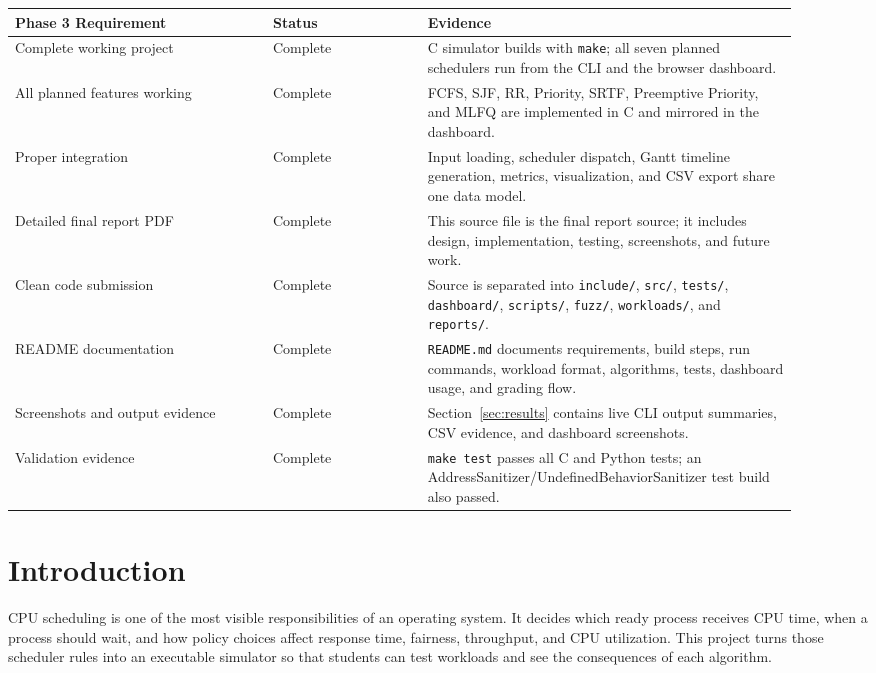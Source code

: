 \documentclass[11pt]{article}
\newcommand{\statusdone}{\textcolor{success}{Complete}}
\begin{document}
\begin{longtable}{p{0.30\linewidth}p{0.18\linewidth}p{0.43\linewidth}}
\toprule
\textbf{Phase 3 Requirement} & \textbf{Status} & \textbf{Evidence} \\
\midrule
Complete working project & \statusdone & C simulator builds with
\texttt{make}; all seven planned schedulers run from the CLI and the browser
dashboard. \\
All planned features working & \statusdone & FCFS, SJF, RR, Priority, SRTF,
Preemptive Priority, and MLFQ are implemented in C and mirrored in the
dashboard. \\
Proper integration & \statusdone & Input loading, scheduler dispatch, Gantt
timeline generation, metrics, visualization, and CSV export share one data
model. \\
Detailed final report PDF & \statusdone & This source file is the final report
source; it includes design, implementation, testing, screenshots, and future
work. \\
Clean code submission & \statusdone & Source is separated into
\texttt{include/}, \texttt{src/}, \texttt{tests/}, \texttt{dashboard/},
\texttt{scripts/}, \texttt{fuzz/}, \texttt{workloads/}, and \texttt{reports/}. \\
README documentation & \statusdone & \texttt{README.md} documents
requirements, build steps, run commands, workload format, algorithms, tests,
dashboard usage, and grading flow. \\
Screenshots and output evidence & \statusdone & Section~\ref{sec:results}
contains live CLI output summaries, CSV evidence, and dashboard screenshots. \\
Validation evidence & \statusdone & \texttt{make test} passes all C and Python
tests; an AddressSanitizer/UndefinedBehaviorSanitizer test build also passed. \\
\bottomrule
\end{longtable}

\section{Introduction}

CPU scheduling is one of the most visible responsibilities of an operating
system. It decides which ready process receives CPU time, when a process should
wait, and how policy choices affect response time, fairness, throughput, and
CPU utilization. This project turns those scheduler rules into an executable
simulator so that students can test workloads and see the consequences of each
algorithm.
\end{document}
